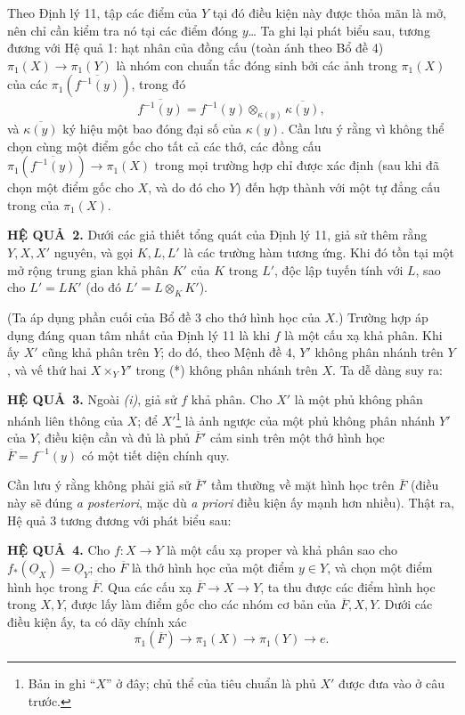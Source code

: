 \documentclass[11pt,twoside,openany]{book}
\numberwithin{equation}{section}
\newcommand{\src}[1]{%
  \phantomsection\hypertarget{src:\fgasourceid:#1}{}%
  \marginpar{\raggedleft\footnotesize\sffamily #1}%
}
\newcommand{\fgasourceid}{unset}
\newcommand{\Osh}{\underline{O}}
\newcommand{\result}[2]{\par\medskip\noindent\textbf{#1\if\relax\detokenize{#2}\relax\else\ #2\fi.}\quad}
\begin{document}
Theo Định lý 11, tập các điểm của $Y$ tại đó điều kiện này được thỏa mãn là
mở, nên chỉ cần kiểm tra nó tại các điểm đóng $y$\ldots{} Ta ghi lại phát biểu
sau, tương đương với Hệ quả 1: hạt nhân của đồng cấu (toàn ánh theo Bổ đề 4)
$\pi_1(X)\longrightarrow\pi_1(Y)$ là nhóm con chuẩn tắc đóng sinh bởi các ảnh
trong $\pi_1(X)$ của các $\pi_1(\overline{f^{-1}(y)})$, trong đó
\[
  \overline{f^{-1}(y)}
  =f^{-1}(y)\otimes_{\kappa(y)}\overline{\kappa(y)},
\]
và $\overline{\kappa(y)}$ ký hiệu một bao đóng đại số của $\kappa(y)$. Cần lưu
ý rằng vì không thể chọn cùng một điểm gốc cho tất cả các thớ, các đồng cấu
$\pi_1(\overline{f^{-1}(y)})\longrightarrow\pi_1(X)$ trong mọi trường hợp chỉ
được xác định (sau khi đã chọn một điểm gốc cho $X$, và do đó cho $Y$) đến hợp
thành với một tự đẳng cấu trong của $\pi_1(X)$.

\result{HỆ QUẢ}{2} Dưới các giả thiết tổng quát của Định lý 11, giả sử thêm
rằng $Y,X,X'$ nguyên, và gọi $K,L,L'$ là các trường hàm tương ứng. Khi đó tồn
tại một mở rộng trung gian khả phân $K'$ của $K$ trong $L'$, độc lập tuyến
tính với $L$, sao cho $L'=LK'$ (do đó $L'=L\otimes_K K'$).

(Ta áp dụng phần cuối của Bổ đề 3 cho thớ hình học của $X$.) Trường hợp áp dụng
đáng quan tâm nhất của Định lý 11 là khi $f$ là một cấu xạ khả phân. Khi ấy
$X'$ cũng khả phân trên $Y$; do đó, theo Mệnh đề 4, $Y'$ không phân nhánh trên
$Y$, và vế thứ hai $X\times_Y Y'$ trong (*) không phân nhánh trên $X$. Ta dễ
dàng suy ra:

\result{HỆ QUẢ}{3} Ngoài \textit{(i)}, giả sử $f$ khả phân. Cho $X'$ là một
phủ không phân nhánh liên thông của $X$; để
$X'$\footnote{Bản in ghi “$X$” ở đây; chủ thể của tiêu chuẩn là phủ $X'$ được
đưa vào ở câu trước.} là ảnh ngược của một phủ không phân nhánh $Y'$ của $Y$,
điều kiện cần và đủ là phủ $\overline F'$ cảm sinh trên một thớ hình học
$\overline F=f^{-1}(y)$ có một tiết diện chính quy.

Cần lưu ý rằng không phải giả sử $\overline F'$ tầm thường về mặt hình học
trên $\overline F$ (điều này sẽ đúng \textit{a posteriori}, mặc dù
\textit{a priori} điều kiện ấy mạnh hơn nhiều). Thật ra, Hệ quả 3 tương đương
với phát biểu sau:

\src{215}
\result{HỆ QUẢ}{4} Cho $f:X\longrightarrow Y$ là một cấu xạ proper và khả
phân sao cho $f_*(\Osh_X)=\Osh_Y$; cho $\overline F$ là thớ hình học của một
điểm $y\in Y$, và chọn một điểm hình học trong $\overline F$. Qua các cấu xạ
$\overline F\longrightarrow X\longrightarrow Y$, ta thu được các điểm hình
học trong $X,Y$, được lấy làm điểm gốc cho các nhóm cơ bản của
$\overline F,X,Y$. Dưới các điều kiện ấy, ta có dãy chính xác
\[
  \boxed{
    \pi_1(\overline F)\longrightarrow\pi_1(X)
    \longrightarrow\pi_1(Y)\longrightarrow e
  }.
\]
\end{document}
